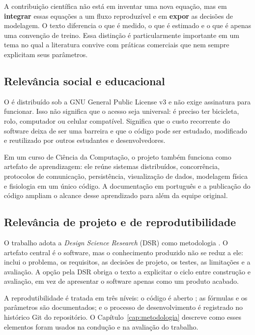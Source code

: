 A contribuição científica não está em inventar uma nova equação, mas em
\textbf{integrar} essas equações a um fluxo reproduzível e em \textbf{expor} as
decisões de modelagem. O texto diferencia o que é medido, o que é estimado e o
que é apenas uma convenção de treino. Essa distinção é particularmente
importante em um tema no qual a literatura convive com práticas comerciais que
nem sempre explicitam seus parâmetros.

\subsection{Relevância social e educacional}
\label{sec:relevancia-social}

O \argus{} é distribuído sob a GNU General Public License v3 \cite{gpl2007} e
não exige assinatura para funcionar. Isso não significa que o acesso seja
universal: é preciso ter bicicleta, rolo, computador ou celular compatível.
Significa que o custo recorrente do software deixa de ser uma barreira e que o
código pode ser estudado, modificado e reutilizado por outros estudantes e
desenvolvedores.

Em um curso de Ciência da Computação, o projeto também funciona como artefato
de aprendizagem: ele reúne sistemas distribuídos, concorrência, protocolos de
comunicação, persistência, visualização de dados, modelagem física e fisiologia
em um único código. A documentação em português e a publicação do código
ampliam o alcance desse aprendizado para além da equipe original.

\subsection{Relevância de projeto e de reprodutibilidade}
\label{sec:relevancia-projeto}

O trabalho adota a \textit{Design Science Research} (DSR) como metodologia
\cite{hevner2004,peffers2007}. O artefato central é o software, mas o
conhecimento produzido não se reduz a ele: inclui o problema, os requisitos, as
decisões de projeto, os testes, as limitações e a avaliação. A opção pela DSR
obriga o texto a explicitar o ciclo entre construção e avaliação, em vez de
apresentar o software apenas como um produto acabado.

A reprodutibilidade é tratada em três níveis: o código é aberto
\cite{argus_github}; as fórmulas e os parâmetros são documentados; e o processo
de desenvolvimento é registrado no histórico Git do repositório. O Capítulo~\ref{cap:metodologia} descreve como
esses elementos foram usados na condução e na avaliação do trabalho.

